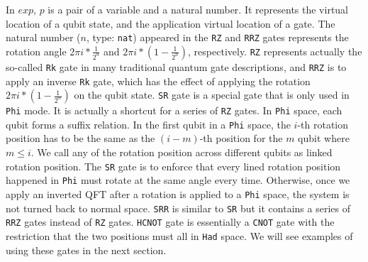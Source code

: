 In $exp$, $p$ is a pair of a variable and a natural number. It represents the virtual location of a qubit state, and the application virtual location of a gate. The natural number ($n$, type: \texttt{nat}) appeared in the \texttt{RZ} and \texttt{RRZ} gates represents the rotation angle $2\pi i *\frac{1}{2^n}$ and $2\pi i *(1-\frac{1}{2^n})$, respectively. \texttt{RZ} represents actually the so-called \texttt{Rk} gate \cite{2000quant} in many traditional quantum gate descriptions, and \texttt{RRZ} is to apply an inverse \texttt{Rk} gate, which has the effect of applying the rotation $2\pi i *(1-\frac{1}{2^n})$ on the qubit state. 
\texttt{SR} gate is a special gate that is only used in \texttt{Phi} mode. It is actually a shortcut for a series of \texttt{RZ} gates. 
In \texttt{Phi} space, each qubit forms a suffix relation. In the first qubit in a \texttt{Phi} space, the $i$-th rotation position has to be the same as the $(i - m)$-th position for the $m$ qubit where $m\le i$. We call any of the rotation position across different qubits as linked rotation position. The \texttt{SR} gate is to enforce that every lined rotation position happened in \texttt{Phi} must rotate at the same angle every time. Otherwise, once we apply an inverted QFT after a rotation is applied to a \texttt{Phi} space, the system is not turned back to normal space. \texttt{SRR} is similar to \texttt{SR} but it contains a series of \texttt{RRZ} gates instead of \texttt{RZ} gates. \texttt{HCNOT} gate is essentially a \texttt{CNOT} gate with the restriction that the two positions must all in \texttt{Had} space. We will see examples of using these gates in the next section.


